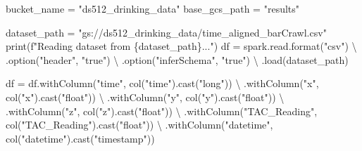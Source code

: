 \documentclass[
  letterpaper,
  DIV=11,
  numbers=noendperiod]{scrartcl}
\newenvironment{Shaded}{\begin{snugshade}}{\end{snugshade}}
\newcommand{\BuiltInTok}[1]{\textcolor[rgb]{0.98,0.46,0.51}{#1}}
\newcommand{\NormalTok}[1]{\textcolor[rgb]{0.88,0.89,0.91}{#1}}
\newcommand{\OperatorTok}[1]{\textcolor[rgb]{0.88,0.89,0.91}{#1}}
\newcommand{\SpecialCharTok}[1]{\textcolor[rgb]{0.47,0.72,1.00}{#1}}
\newcommand{\SpecialStringTok}[1]{\textcolor[rgb]{0.62,0.80,1.00}{#1}}
\newcommand{\StringTok}[1]{\textcolor[rgb]{0.62,0.80,1.00}{#1}}
\begin{document}
\begin{Shaded}
\begin{Highlighting}[]
\NormalTok{    bucket\_name }\OperatorTok{=} \StringTok{"ds512\_drinking\_data"}
\NormalTok{    base\_gcs\_path }\OperatorTok{=} \StringTok{"results"}

\NormalTok{    dataset\_path }\OperatorTok{=} \StringTok{"gs://ds512\_drinking\_data/time\_aligned\_barCrawl.csv"}
    \BuiltInTok{print}\NormalTok{(}\SpecialStringTok{f"Reading dataset from }\SpecialCharTok{\{}\NormalTok{dataset\_path}\SpecialCharTok{\}}\SpecialStringTok{..."}\NormalTok{)}
\NormalTok{    df }\OperatorTok{=}\NormalTok{ spark.read.}\BuiltInTok{format}\NormalTok{(}\StringTok{"csv"}\NormalTok{) }\OperatorTok{\textbackslash{}}
\NormalTok{        .option(}\StringTok{"header"}\NormalTok{, }\StringTok{"true"}\NormalTok{) }\OperatorTok{\textbackslash{}}
\NormalTok{        .option(}\StringTok{"inferSchema"}\NormalTok{, }\StringTok{"true"}\NormalTok{) }\OperatorTok{\textbackslash{}}
\NormalTok{        .load(dataset\_path)}

\NormalTok{    df }\OperatorTok{=}\NormalTok{ df.withColumn(}\StringTok{"time"}\NormalTok{, col(}\StringTok{"time"}\NormalTok{).cast(}\StringTok{"long"}\NormalTok{)) }\OperatorTok{\textbackslash{}}
\NormalTok{           .withColumn(}\StringTok{"x"}\NormalTok{, col(}\StringTok{"x"}\NormalTok{).cast(}\StringTok{"float"}\NormalTok{)) }\OperatorTok{\textbackslash{}}
\NormalTok{           .withColumn(}\StringTok{"y"}\NormalTok{, col(}\StringTok{"y"}\NormalTok{).cast(}\StringTok{"float"}\NormalTok{)) }\OperatorTok{\textbackslash{}}
\NormalTok{           .withColumn(}\StringTok{"z"}\NormalTok{, col(}\StringTok{"z"}\NormalTok{).cast(}\StringTok{"float"}\NormalTok{)) }\OperatorTok{\textbackslash{}}
\NormalTok{           .withColumn(}\StringTok{"TAC\_Reading"}\NormalTok{, col(}\StringTok{"TAC\_Reading"}\NormalTok{).cast(}\StringTok{"float"}\NormalTok{)) }\OperatorTok{\textbackslash{}}
\NormalTok{           .withColumn(}\StringTok{"datetime"}\NormalTok{, col(}\StringTok{"datetime"}\NormalTok{).cast(}\StringTok{"timestamp"}\NormalTok{))}


\end{Highlighting}
\end{Shaded}
\end{document}
